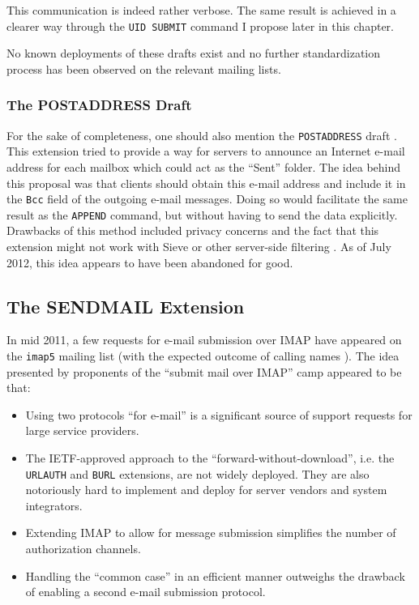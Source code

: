 \documentclass[trojita]{subfiles}
\begin{document}
This communication is indeed rather verbose.  The same result is achieved in a clearer way through the {\tt UID SUBMIT}
command I propose later in this chapter.

No known deployments of these drafts exist and no further standardization process has been observed on the relevant
mailing lists.

\subsubsection{The POSTADDRESS Draft}

For the sake of completeness, one should also mention the {\tt POSTADDRESS} draft
\cite{draft-melnikov-imap-postaddress}.  This extension tried to provide a way for servers to announce an Internet
e-mail address for each mailbox which could act as the ``Sent'' folder.  The idea behind this proposal was that clients
should obtain this e-mail address and include it in the {\tt Bcc} field of the outgoing e-mail messages.  Doing so would
facilitate the same result as the {\tt APPEND} command, but without having to send the data explicitly.  Drawbacks of
this method included privacy concerns and the fact that this extension might not work with Sieve or other server-side
filtering \cite{postaddress-sieve}.  As of July 2012, this idea appears to have been abandoned for good.

\subsection{The SENDMAIL Extension}

In mid 2011, a few requests for e-mail submission over IMAP have appeared on the {\tt imap5} mailing list
\cite{brong-imap5-list-of-ideas} (with the expected outcome of calling names \cite{crispin-brong-you-suck-useless}).
The idea presented by proponents of the ``submit mail over IMAP'' camp appeared to be that:

\begin{itemize}
  \item Using two protocols ``for e-mail'' is a significant source of support requests for large service providers.
  \item The IETF-approved approach to the ``forward-without-download'', i.e. the {\tt URLAUTH} and {\tt BURL}
    extensions, are not widely deployed.  They are also notoriously hard to implement and deploy for server vendors and
    system integrators.
  \item Extending IMAP to allow for message submission simplifies the number of authorization channels.
  \item Handling the ``common case'' in an efficient manner outweighs the drawback of enabling a second e-mail
    submission protocol.
\end{itemize}
\end{document}

